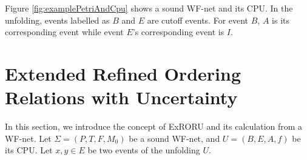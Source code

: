 \documentclass{llncs}
\begin{document}
\begin{example}\label{ex:petriAndCpu}
Figure \ref{fig:examplePetriAndCpu} shows a sound WF-net and its CPU. In the unfolding, events labelled as $B$ and $E$ are cutoff events. For event $B$, $A$ is its corresponding event while event $E$'s corresponding event is $I$.
\end{example}



\section{Extended Refined Ordering Relations with Uncertainty}\label{sec:relations}
In this section, we introduce the concept of ExRORU and its calculation from a WF-net. Let $\Sigma=(P,T,F,M_{0})$ be a sound WF-net, and $U=(B,E,A,f)$ be its CPU. Let $x,y\in E$ be two events of the unfolding $U$.
\end{document}
